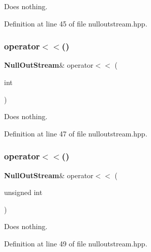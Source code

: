 Does nothing. 



Definition at line 45 of file nulloutstream.\+hpp.

\mbox{\label{classmlpack_1_1util_1_1NullOutStream_aa3bda18b626dd9cef532c3b40efac1ac}} 
\subsubsection{operator$<$$<$()\hspace{0.1cm}{\footnotesize\ttfamily [4/18]}}
{\footnotesize\ttfamily \textbf{ Null\+Out\+Stream}\& operator$<$$<$ (\begin{DoxyParamCaption}\item[{int}]{ }\end{DoxyParamCaption})\hspace{0.3cm}{\ttfamily [inline]}}



Does nothing. 



Definition at line 47 of file nulloutstream.\+hpp.

\mbox{\label{classmlpack_1_1util_1_1NullOutStream_af5b9bd47fc9d7e4f985e7061b124eb94}} 
\subsubsection{operator$<$$<$()\hspace{0.1cm}{\footnotesize\ttfamily [5/18]}}
{\footnotesize\ttfamily \textbf{ Null\+Out\+Stream}\& operator$<$$<$ (\begin{DoxyParamCaption}\item[{unsigned}]{int }\end{DoxyParamCaption})\hspace{0.3cm}{\ttfamily [inline]}}



Does nothing. 



Definition at line 49 of file nulloutstream.\+hpp.

